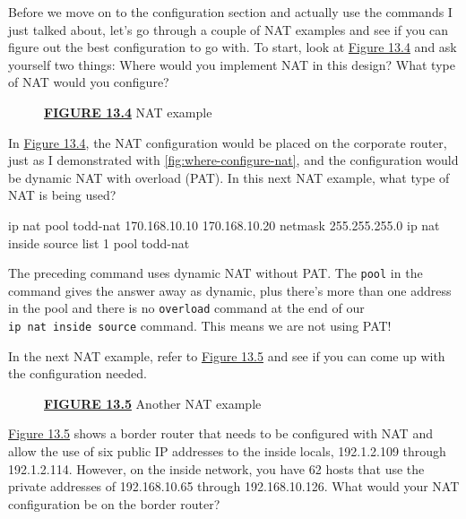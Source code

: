Before we move on to the configuration section and actually use the
commands I just talked about, let's go through a couple of NAT examples
and see if you can figure out the best configuration to go with. To
start, look at \protect\hyperlink{c13.xhtmlux5cux23figure13-4}{Figure
13.4} and ask yourself two things: Where would you implement NAT in this
design? What type of NAT would you configure?



\begin{figure}
\centering

\caption{{\protect\hyperlink{c13.xhtmlux5cux23figureanchor13-4}{\textbf{FIGURE
13.4}} NAT example}}
\end{figure}

In \protect\hyperlink{c13.xhtmlux5cux23figure13-4}{Figure 13.4}, the NAT
configuration would be placed on the corporate router, just as I
demonstrated with \cref{fig:where-configure-nat}, and the configuration would be dynamic NAT with overload (PAT).
In this next NAT example, what type of NAT is being used?

\begin{cli}
ip nat pool todd-nat 170.168.10.10 170.168.10.20 netmask 255.255.255.0
ip nat inside source list 1 pool todd-nat
\end{cli}

The preceding command uses dynamic NAT without PAT. The \texttt{pool} in
the command gives the answer away as dynamic, plus there's more than one
address in the pool and there is no \texttt{overload} command at the end
of our \texttt{ip\ nat\ inside\ source} command. This means we are not
using PAT!

In the next NAT example, refer to
\protect\hyperlink{c13.xhtmlux5cux23figure13-5}{Figure 13.5} and see if
you can come up with the configuration needed.

\begin{figure}
\centering

\caption{{\protect\hyperlink{c13.xhtmlux5cux23figureanchor13-5}{\textbf{FIGURE
13.5}} Another NAT example}}
\end{figure}

\protect\hyperlink{c13.xhtmlux5cux23figure13-5}{Figure
13.5} shows a border router that needs to be configured with NAT and
allow the use of six public IP addresses to the inside locals,
192.1.2.109 through 192.1.2.114. However, on the inside network, you
have 62 hosts that use the private addresses of 192.168.10.65 through
192.168.10.126. What would your NAT configuration be on the border
router?

